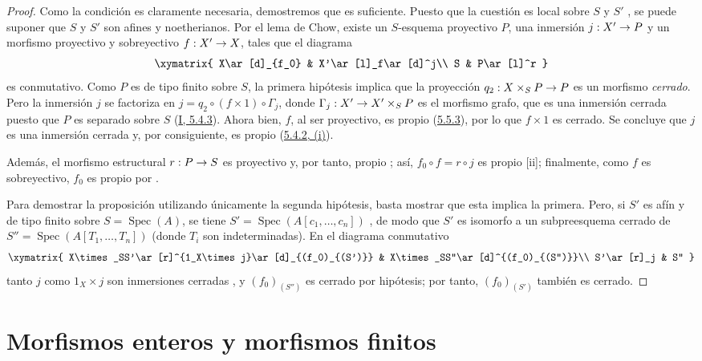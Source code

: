 \documentclass[oneside,10pt]{amsart}
\makeatletter
\newcommand{\ega@arrow}[2]{\mathchoice{#1}{#2}{#2}{#2}}
\renewcommand{\to}{\ega@arrow{\longrightarrow}{\rightarrow}}
\newcommand{\oldpage}[2][]{\marginnote{\normalfont\footnotesize\textbf{#1}~|~#2}\ignorespaces}
\let\EGAOriginalLabel\label
\renewcommand{\label}[1]{\phantomsection\EGAOriginalLabel{#1}}
\makeatother
\begin{document}
\begin{proof}
Como la condición es claramente necesaria, demostremos que es suficiente.
Puesto que la cuestión es local sobre $S$ y $S'$ , se puede suponer que $S$ y $S'$ son afines y noetherianos.
Por el lema de Chow, existe un $S$-esquema proyectivo $P$, una inmersión $j:X'\to P$ y un morfismo proyectivo y sobreyectivo $f:X'\to X$, tales que el diagrama
\[
\xymatrix{
X\ar[d]_{f_0} & X'\ar[l]_f\ar[d]^j\\
S & P\ar[l]^r
}
\]
es conmutativo.
Como $P$ es de tipo finito sobre $S$, la primera hipótesis implica que la proyección $q_2:X\times_SP\to P$ es un morfismo \emph{cerrado}.
Pero la inmersión $j$ se factoriza en $j=q_2\circ(f\times1)\circ\Gamma_j$, donde $\Gamma_j:X'\to X'\times_SP$ es el morfismo grafo, que es una inmersión cerrada puesto que $P$ es separado sobre $S$ (\hyperref[I.5.4.3-fr]{I, 5.4.3}). Ahora bien, $f$, al ser proyectivo, es propio (\hyperref[II.5.5.3-fr]{5.5.3}), por lo que $f\times1$ es cerrado. Se concluye que $j$ es una inmersión cerrada y, por consiguiente, es propio (\hyperref[II.5.4.2-fr]{5.4.2, (i)}).

Además, el morfismo estructural $r:P\to S$ es proyectivo y, por tanto, propio ; así, $f_0\circ f=r\circ j$ es propio [ii];
finalmente, como $f$ es sobreyectivo, $f_0$ es propio por .

Para demostrar la proposición utilizando únicamente la segunda hipótesis, basta mostrar que esta implica la primera.
Pero, si $S'$ es afín y de tipo finito sobre $S=\operatorname{Spec}(A)$,
\oldpage[II]{110}
se tiene $S'=\operatorname{Spec}(A[c_1,\ldots,c_n])$ , de modo que $S'$ es isomorfo a un subpreesquema cerrado de $S''=\operatorname{Spec}(A[T_1,\ldots,T_n])$ (donde $T_i$ son indeterminadas).
En el diagrama conmutativo
\[
\xymatrix{
X\times_SS'\ar[r]^{1_X\times j}\ar[d]_{(f_0)_{(S')}} &
X\times_SS''\ar[d]^{(f_0)_{(S'')}}\\
S'\ar[r]_j & S''
}
\]
tanto $j$ como $1_X\times j$ son inmersiones cerradas , y $(f_0)_{(S'')}$ es cerrado por hipótesis; por tanto, $(f_0)_{(S')}$ también es cerrado.
\end{proof}

\section{Morfismos enteros y morfismos finitos}
\label{section:II.6-fr}
\end{document}
